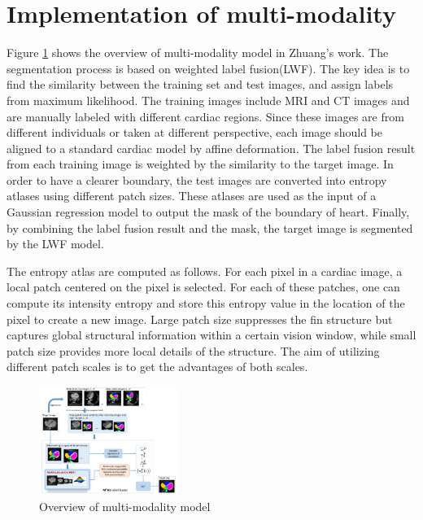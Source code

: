 \documentclass[10pt,sigconf,letterpaper,nonacm]{acmart}
\begin{document}
\section{Implementation of multi-modality}
 Figure \ref{yihao_overview} shows the overview of multi-modality model in Zhuang's work\cite{zhuang2016multi}. The segmentation process is based on weighted label fusion(LWF). The key idea is to find the similarity between the training set and test images, and assign labels from maximum likelihood. The training images include MRI and CT images and are manually labeled with different cardiac regions. Since these images are from different individuals or taken at different perspective, each image should be aligned to a standard cardiac model by affine deformation. The label fusion result from each training image is weighted by the similarity to the target image. In order to have a clearer boundary, the test images are converted into entropy atlases using different patch sizes. These atlases are used as the input of a Gaussian regression model to output the mask of the boundary of heart. Finally, by combining the label fusion result and the mask, the target image is segmented by the LWF model.
 
 The entropy atlas are computed as follows\cite{wachinger2012entropy}. For each pixel in a cardiac image, a local patch centered on the pixel is selected. For each of these patches, one can compute its intensity entropy and store this entropy value in the location of the pixel to create a new image. Large patch size suppresses the fin structure but captures global structural information within a certain vision window, while small patch size provides more local details of the structure. The aim of utilizing different patch scales is to get the advantages of both scales.
 
 
\begin{figure}
	\centering
	\includegraphics[width=0.4\textwidth]{images/yihao_overview.png}
	\caption{Overview of multi-modality model}
	\label{yihao_overview}
\end{figure} 
 
\end{document}
